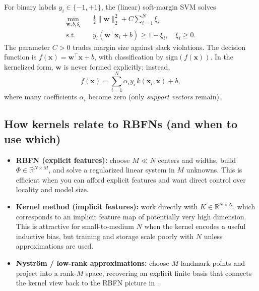 For binary labels \(y_i\in\{-1,+1\}\), the (linear) soft-margin SVM solves \citep{Cortes1995}
\begin{align*}
    \min_{\mathbf{w}, b,\boldsymbol{\xi}} \quad & \frac{1}{2}\|\mathbf{w}\|_2^2 + C\sum_{i=1}^N \xi_i \\
    \text{s.t.}\quad & y_i(\mathbf{w}^\top \mathbf{x}_i + b)\ge 1-\xi_i,\quad \xi_i\ge 0.
\end{align*}
The parameter \(C>0\) trades margin size against slack violations. The decision function is \(f(\mathbf{x})=\mathbf{w}^\top\mathbf{x}+b\), with classification by \(\mathrm{sign}(f(\mathbf{x}))\). In the kernelized form, \(\mathbf{w}\) is never formed explicitly; instead,
\begin{equation}
    f(\mathbf{x})=\sum_{i=1}^N \alpha_i y_i\, k(\mathbf{x}_i,\mathbf{x}) + b,
    \label{eq:svm_kernel_decision}
\end{equation}
where many coefficients \(\alpha_i\) become zero (only \emph{support vectors} remain).

\subsection*{How kernels relate to RBFNs (and when to use which)}

\begin{itemize}
    \item \textbf{RBFN (explicit features):} choose \(M\ll N\) centers and widths, build \(\Phi\in\mathbb{R}^{N\times M}\), and solve a regularized linear system in \(M\) unknowns. This is efficient when you can afford explicit features and want direct control over locality and model size.
    \item \textbf{Kernel method (implicit features):} work directly with \(K\in\mathbb{R}^{N\times N}\), which corresponds to an implicit feature map of potentially very high dimension. This is attractive for small-to-medium \(N\) when the kernel encodes a useful inductive bias, but training and storage scale poorly with \(N\) unless approximations are used.
    \item \textbf{Nystr\"om / low-rank approximations:} choose \(M\) landmark points and project into a rank-\(M\) space, recovering an explicit finite basis that connects the kernel view back to the RBFN picture in .
\end{itemize}
\endgroup
